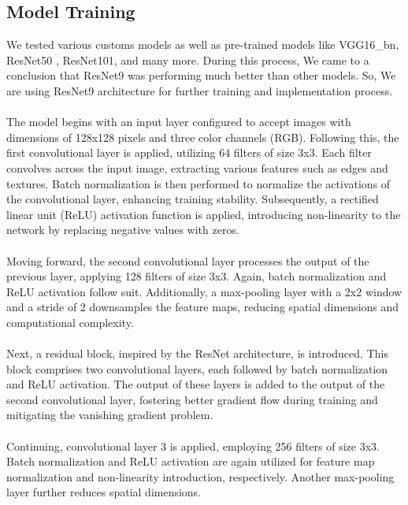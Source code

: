 	\subsection{Model Training}
		We tested various customs models as well as pre-trained models like VGG16\_bn\cite{simonyan2015deep}, ResNet50 \cite{DBLP:journals/corr/HeZRS15}, ResNet101\cite{DBLP:journals/corr/HeZRS15}, and many more. During this process, We came to a conclusion that ResNet9 was performing much better than other models. So, We are using ResNet9 architecture for further training and implementation process.\\\\
		The model begins with an input layer configured to accept images with dimensions of 128x128 pixels and three color channels (RGB). Following this, the first convolutional layer is applied, utilizing 64 filters of size 3x3. Each filter convolves across the input image, extracting various features such as edges and textures. Batch normalization is then performed to normalize the activations of the convolutional layer, enhancing training stability. Subsequently, a rectified linear unit (ReLU) activation function is applied, introducing non-linearity to the network by replacing negative values with zeros.\\\\
		Moving forward, the second convolutional layer processes the output of the previous layer, applying 128 filters of size 3x3. Again, batch normalization and ReLU activation follow suit. Additionally, a max-pooling layer with a 2x2 window and a stride of 2 downsamples the feature maps, reducing spatial dimensions and computational complexity.\\\\
		Next, a residual block, inspired by the ResNet architecture, is introduced. This block comprises two convolutional layers, each followed by batch normalization and ReLU activation. The output of these layers is added to the output of the second convolutional layer, fostering better gradient flow during training and mitigating the vanishing gradient problem.\\\\
		Continuing, convolutional layer 3 is applied, employing 256 filters of size 3x3. Batch normalization and ReLU activation are again utilized for feature map normalization and non-linearity introduction, respectively. Another max-pooling layer further reduces spatial dimensions.\\\\

